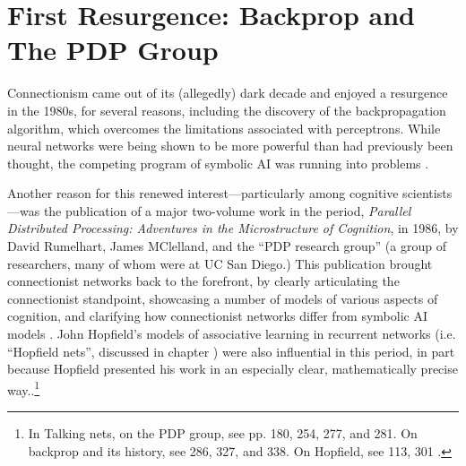 \section{First Resurgence: Backprop and The PDP Group}\label{first_resurgence}


Connectionism came out of its (allegedly) dark decade and enjoyed a resurgence in the 1980s, for several reasons, including the discovery of the backpropagation algorithm, which overcomes the limitations associated with perceptrons. While neural networks were being shown to be more powerful than had previously been thought, the competing program of symbolic AI was running into problems \cite{dreyfus1992computers}. 

Another reason for this renewed interest---particularly among cognitive scientists---was the publication of a major two-volume work in the period, {\em Parallel Distributed Processing: Adventures in the Microstructure of Cognition}, in 1986, by David Rumelhart, James MClelland, and the ``PDP research group'' (a group of researchers, many of whom were at UC San Diego.)  This publication brought connectionist networks back to the forefront, by clearly articulating the connectionist standpoint, showcasing a number of models of various aspects of cognition, and clarifying how connectionist networks differ from symbolic AI models \cite{rumelhart1986parallel}. John Hopfield's models of associative learning in recurrent networks (i.e. ``Hopfield nets'', discussed in chapter ) were also influential in this period, in part because Hopfield presented his work in an especially clear, mathematically precise way.\cite{hopfield1982neural}.\footnote{In Talking nets, on the PDP group, see pp. 180, 254, 277, and 281. On  backprop and its history, see 286, 327, and 338. On Hopfield, see 113, 301 \cite{anderson2000talking}.}


